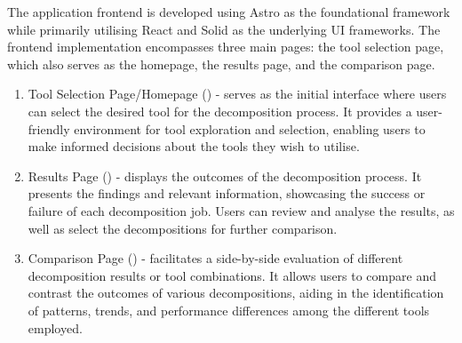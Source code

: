 The application frontend is developed using Astro as the foundational framework
while primarily utilising React and Solid as the underlying UI frameworks. The
frontend implementation encompasses three main pages: the tool selection page,
which also serves as the homepage, the results page, and the comparison page.

\begin{enumerate}
  \item Tool Selection Page/Homepage () -
    serves as the initial interface where users can select the desired tool for
    the decomposition process. It provides a user-friendly environment for tool
    exploration and selection, enabling users to make informed decisions about
    the tools they wish to utilise.
  \item Results Page () - displays the outcomes of
    the decomposition process. It presents the findings and relevant
    information, showcasing the success or failure of each decomposition job.
    Users can review and analyse the results, as well as select the
    decompositions for further comparison.
  \item Comparison Page () - facilitates a
    side-by-side evaluation of different decomposition results or tool
    combinations. It allows users to compare and contrast the outcomes of
    various decompositions, aiding in the identification of patterns, trends,
    and performance differences among the different tools employed.
\end{enumerate}
